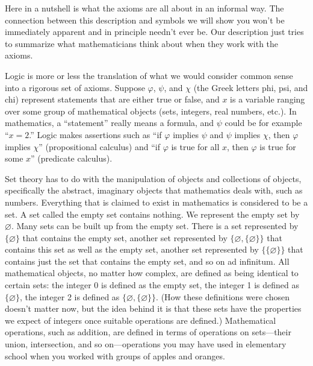Here in a nutshell is what the axioms are all about in an informal way. The
connection between this description and symbols we will show you won't be
immediately apparent and in principle needn't ever be.  Our description just
tries to summarize what mathematicians think about when they work with the
axioms.

Logic is more or less the translation of what we would consider common sense
into a rigorous set of axioms.  Suppose $\varphi$,
$\psi$, and $\chi$ (the Greek letters phi, psi, and chi) represent statements
that are either true or false, and $x$ is a variable ranging over some group of mathematical objects (sets, integers,
real numbers, etc.). In mathematics, a ``statement'' really means a formula,
and $\psi$ could be for example ``$x = 2$.'' Logic makes assertions such as
``if $\varphi$ implies $\psi$ and $\psi$ implies $\chi$, then $\varphi$
implies $\chi$'' (propositional calculus) and
``if $\varphi$ is true for all $x$, then $\varphi$ is true for some $x$''
(predicate calculus).

Set theory has to do with the manipulation of objects and
collections of objects, specifically the abstract, imaginary objects that
mathematics deals with, such as numbers. Everything that is claimed to exist
in mathematics is considered to be a set.  A set called the empty
set contains nothing.  We represent the empty set by
$\varnothing$.  Many sets can be built up from the empty set.  There is a set
represented by $\{\varnothing\}$ that contains the empty set, another set
represented by $\{\varnothing,\{\varnothing\}\}$ that contains this set as
well as the empty set, another set represented by $\{\{\varnothing\}\}$ that
contains just the set that contains the empty set, and so on ad infinitum. All
mathematical objects, no matter how complex, are defined as being identical to
certain sets: the integer 0 is defined as the empty set, the
integer 1 is defined as $\{\varnothing\}$, the integer 2 is defined as
$\{\varnothing,\{\varnothing\}\}$.  (How these definitions were chosen doesn't
matter now, but the idea behind it is that these sets have the properties we
expect of integers once suitable operations are defined.)  Mathematical
operations, such as addition, are defined in terms of operations on
sets---their union, intersection, and
so on---operations you may have used in elementary school when you worked
with groups of apples and oranges.

